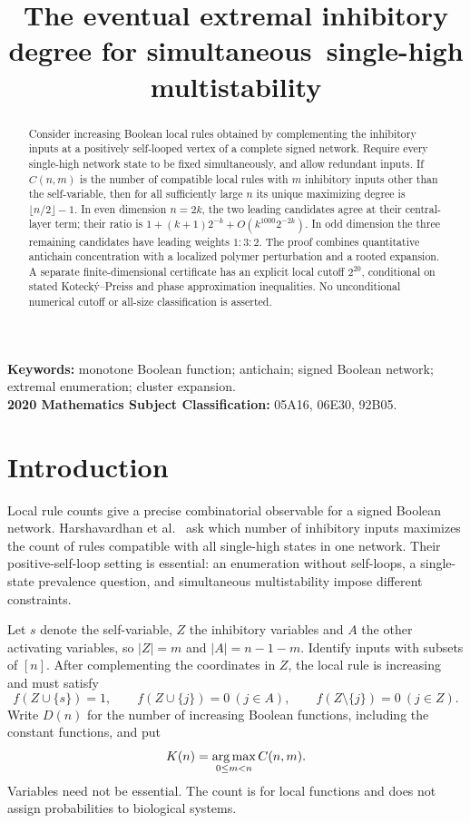 \documentclass[11pt]{article}
\title{The eventual extremal inhibitory degree for simultaneous\allowbreak\ single-high multistability}
\author{}
\date{}
\makeatletter
\theoremstyle{remark}\newtheorem{remark}[theorem]{Remark}
\renewcommand{\maketitle}{\begin{center}{\Large\bfseries\@title\par}\end{center}\vspace{0.5em}}
\makeatother
\begin{document}
\maketitle
\begin{abstract}
Consider increasing Boolean local rules obtained by complementing the
inhibitory inputs at a positively self-looped vertex of a complete signed
network. Require every single-high network state to be fixed simultaneously,
and allow redundant inputs. If $C(n,m)$ is the number of compatible local
rules with $m$ inhibitory inputs other than the self-variable, then for all
sufficiently large $n$ its unique maximizing degree is
$\lfloor n/2\rfloor-1$. In even dimension $n=2k$, the two leading
candidates agree at their central-layer term; their ratio is
$1+(k+1)2^{-k}+O(k^{1000}2^{-2k})$. In odd dimension the three remaining
candidates have leading weights $1:3:2$. The proof combines quantitative
antichain concentration with a localized polymer perturbation and a rooted
expansion. A separate finite-dimensional certificate has an explicit local
cutoff $2^{20}$, conditional on stated Koteck\'{y}--Preiss and phase
approximation inequalities. No unconditional numerical cutoff or all-size
classification is asserted.
\end{abstract}
\noindent\textbf{Keywords:} monotone Boolean function; antichain; signed
Boolean network; extremal enumeration; cluster expansion.\\
\textbf{2020 Mathematics Subject Classification:} 05A16, 06E30, 92B05.

\section{Introduction}
Local rule counts give a precise combinatorial observable for a signed
Boolean network. Harshavardhan et al.\ \cite[Section 6.3]{GRN} ask which
number of inhibitory inputs maximizes the count of rules compatible with
all single-high states in one network. Their positive-self-loop setting is
essential: an enumeration without self-loops, a single-state prevalence
question, and simultaneous multistability impose different constraints.

Let $s$ denote the self-variable, $Z$ the inhibitory variables and $A$ the
other activating variables, so $|Z|=m$ and $|A|=n-1-m$. Identify inputs with
subsets of $[n]$. After complementing the coordinates in $Z$, the local rule
is increasing and must satisfy
\begin{equation}\label{eq:constraints}
 f(Z\cup\{s\})=1,\qquad
 f(Z\cup\{j\})=0\ (j\in A),\qquad
 f(Z\setminus\{j\})=0\ (j\in Z).
\end{equation}
Write $D(n)$ for the number of increasing Boolean functions, including the
constant functions, and put
\[
 K(n)=\mathop{\rm arg\,max}_{0\le m<n}C(n,m).
\]
Variables need not be essential. The count is for local functions and does
not assign probabilities to biological systems.
\end{document}
